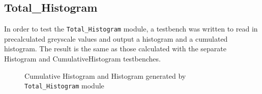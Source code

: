 \documentclass[12pt]{article}
\begin{document}
  \subsection{Total\_Histogram}
    In order to test the \texttt{Total\_Histogram} module, a testbench was written to read in precalculated greyscale values and output a histogram and a cumulated histogram. The result is the same as those calculated with the separate Histogram and CumulativeHistogram testbenches.
  \begin{figure}[H]
    \caption{Cumulative Histogram and Histogram generated by \texttt{Total\_Histogram} module}
    \label{fig:cumulative_histogram_testbench}
  \end{figure} 
  
  \newpage
\end{document}

